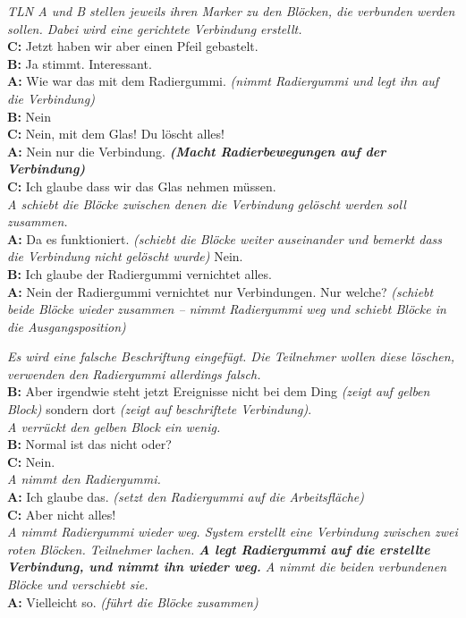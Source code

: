 \begin{transkript}
	\emph{TLN A und B stellen jeweils ihren Marker zu den Blöcken, die verbunden werden sollen. Dabei wird eine gerichtete Verbindung erstellt.}\\
	\textbf{C:} Jetzt haben wir aber einen Pfeil gebastelt.\\
	\textbf{B:} Ja stimmt. Interessant.\\
	\textbf{A:} Wie war das mit dem Radiergummi. \emph{(nimmt Radiergummi und legt ihn auf die Verbindung)}\\
	\textbf{B:} Nein\\
	\textbf{C:} Nein, mit dem Glas! Du löscht alles!\\
	\textbf{A:} Nein nur die Verbindung. \textbf{\emph{(Macht Radierbewegungen auf der Verbindung)}}\\
	\textbf{C:} Ich glaube dass wir das Glas nehmen müssen.\\
	\emph{A schiebt die Blöcke zwischen denen die Verbindung gelöscht werden soll zusammen.}\\
	\textbf{A:} Da es funktioniert. \emph{(schiebt die Blöcke weiter auseinander und bemerkt dass die Verbindung nicht gelöscht wurde)} Nein.\\
	\textbf{B:} Ich glaube der Radiergummi vernichtet alles.\\
	\textbf{A:} Nein der Radiergummi vernichtet nur Verbindungen. Nur welche? \emph{(schiebt beide Blöcke wieder zusammen – nimmt Radiergummi weg und schiebt Blöcke in die Ausgangsposition)}
\end{transkript}

\begin{transkript}
	\emph{Es wird eine falsche Beschriftung eingefügt. Die Teilnehmer wollen diese löschen, verwenden den Radiergummi allerdings falsch.}\\
	\textbf{B:} Aber irgendwie steht jetzt Ereignisse nicht bei dem Ding \emph{(zeigt auf gelben Block)} sondern dort \emph{(zeigt auf beschriftete Verbindung)}.\\
	\emph{A verrückt den gelben Block ein wenig.}\\
	\textbf{B:} Normal ist das nicht oder?\\
	\textbf{C:} Nein.\\
	\emph{A nimmt den Radiergummi.}\\
	\textbf{A:} Ich glaube das. \emph{(setzt den Radiergummi auf die Arbeitsfläche)}\\
	\textbf{C:} Aber nicht alles!\\
	\emph{A nimmt Radiergummi wieder weg. System erstellt eine Verbindung zwischen zwei roten Blöcken. Teilnehmer lachen. \textbf{A legt Radiergummi auf die erstellte Verbindung, und nimmt ihn wieder weg.} A nimmt die beiden verbundenen Blöcke und verschiebt sie.}\\
	\textbf{A:} Vielleicht so. \emph{(führt die Blöcke zusammen)}
\end{transkript}

